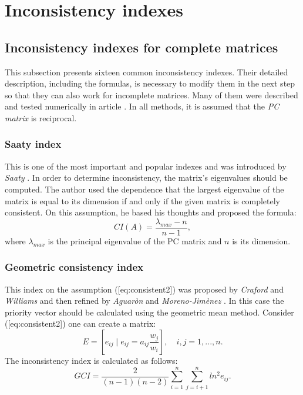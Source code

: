 \chapter{Inconsistency indexes}
\label{sec:inconsistencyIndexes}
\section{Inconsistency indexes for complete matrices}

This subsection presents sixteen common inconsistency indexes. Their detailed description, including the formulas, is necessary to modify them in the next step so that they can also work for incomplete matrices. Many of them were described and tested numerically in article \cite{Brunelli2013}. In all methods, it is assumed that the \textit{PC matrix} is reciprocal.


 \subsection{Saaty index}

This is one of the most important and popular indexes and was introduced by \textit{Saaty} \cite{SAATY1977}. In order to determine inconsistency, the matrix's eigenvalues should be computed. The author used the dependence that the largest eigenvalue of the matrix is equal to its dimension if and only if the given matrix is completely consistent. On this assumption, he based his thoughts and proposed the formula:
	\begin{equation} 
		CI(A)=\frac{\lambda_{max}-n}{n-1},
	 \end{equation}
 where $\lambda_{max}$
  is the principal eigenvalue of the PC matrix and $n$
  is its dimension.


\subsection{Geometric consistency index}

This index on the assumption ([eq:consistent2]) was proposed by \textit{Craford} and \textit{Williams} \cite{CRAWFORD1985} and then refined by \textit{Aguaròn} and \textit{Moreno-Jimènez} \cite{AGUARON2003}. In this case the priority vector should be calculated using the geometric mean method. Consider ([eq:consistent2]) one can create a matrix:
	\begin{equation} 
		E=\left[e_{ij}\mid e_{ij}=a_{ij}\frac{w_{j}}{w_{i}}\right],\,\,\,\,\,\,i,j=1,...,n.
	 \end{equation}
 The inconsistency index is calculated as follows:
 	\begin{equation} 
		GCI=\frac{2}{(n-1)(n-2)}\sum_{i=1}^{n}\sum_{j=i+1}^{n}ln^{2}e_{ij}.
	 \end{equation}
 

